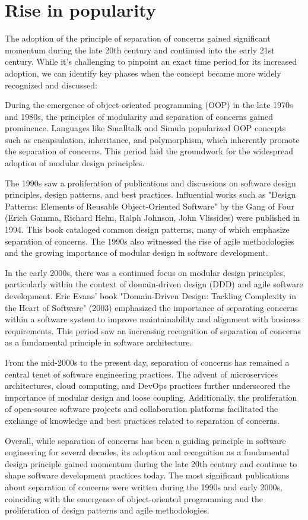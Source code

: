 \section{Rise in popularity}
The adoption of the principle of separation of concerns gained significant momentum during the late 20th century and continued into the early 21st century.
While it's challenging to pinpoint an exact time period for its increased adoption, 
we can identify key phases when the concept became more widely recognized and discussed:
\par
During the emergence of object-oriented programming (OOP) in the late 1970s and 1980s, the principles of modularity and separation of concerns gained prominence.
Languages like Smalltalk and Simula popularized OOP concepts such as encapsulation, inheritance, and polymorphism, which inherently promote the separation of concerns.
This period laid the groundwork for the widespread adoption of modular design principles.
\par
The 1990s saw a proliferation of publications and discussions on software design principles, design patterns, and best practices.
Influential works such as "Design Patterns: Elements of Reusable Object-Oriented Software" by the Gang of Four (Erich Gamma, Richard Helm, Ralph Johnson, John Vlissides) were published in 1994.
This book cataloged common design patterns, many of which emphasize separation of concerns.
The 1990s also witnessed the rise of agile methodologies and the growing importance of modular design in software development.
\par
In the early 2000s, there was a continued focus on modular design principles, particularly within the context of domain-driven design (DDD) and agile software development.
Eric Evans' book "Domain-Driven Design: Tackling Complexity in the Heart of Software" (2003) emphasized the importance of separating concerns within a software system to improve maintainability and alignment with business requirements.
This period saw an increasing recognition of separation of concerns as a fundamental principle in software architecture.
\par 
From the mid-2000s to the present day, separation of concerns has remained a central tenet of software engineering practices.
The advent of microservices architectures, cloud computing, and DevOps practices further underscored the importance of modular design and loose coupling.
Additionally, the proliferation of open-source software projects and collaboration platforms facilitated the exchange of knowledge and best practices related to separation of concerns.
\par
Overall, while separation of concerns has been a guiding principle in software engineering for several decades, its adoption 
and recognition as a fundamental design principle gained momentum during the late 20th century and continue to shape software development practices today.
The most significant publications about separation of concerns were written during the 1990s and early 2000s, 
coinciding with the emergence of object-oriented programming and the proliferation of design patterns and agile methodologies.


